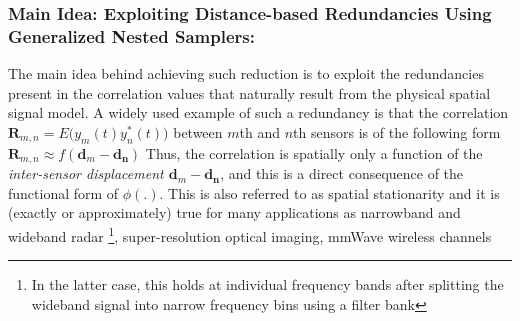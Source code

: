\subsubsection{Main Idea: Exploiting Distance-based Redundancies Using Generalized Nested Samplers:} The main idea behind achieving such reduction is to exploit the redundancies present in the correlation values that naturally result from the physical spatial signal model. A widely used example of such a redundancy is that the correlation $\mathbf{R}_{m,n} = E\Big(y_m(t)y^*_n(t)\Big)$ between $m$th and $n$th sensors is of the following form %
$\mathbf{R}_{m,n} \approx f(\mathbf{d}_m - \mathbf{d_n}) \label{eqn:CorrRed}$
Thus, the correlation is spatially only a function of the {\em inter-sensor displacement $\mathbf{d}_m - \mathbf{d_n}$}, and this is a direct consequence of the functional form of $\phi(.)$. This is also referred to as spatial stationarity and it is (exactly or approximately) true for many applications as narrowband and wideband radar \footnote{In the latter case, this holds at individual frequency bands after splitting the wideband signal into narrow frequency bins using a filter bank}, super-resolution optical imaging, mmWave wireless channels %
